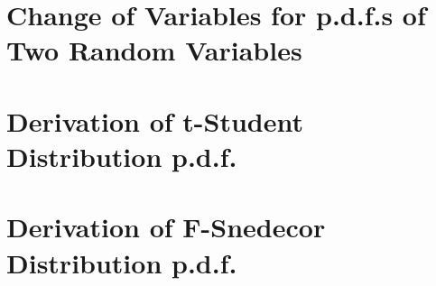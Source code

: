 \documentclass[12pt]{article}
\begin{document}
\section{Change of Variables for p.d.f.s of Two Random Variables}
\section{Derivation of t-Student Distribution p.d.f.}
\section{Derivation of F-Snedecor Distribution p.d.f.}




\end{document}
